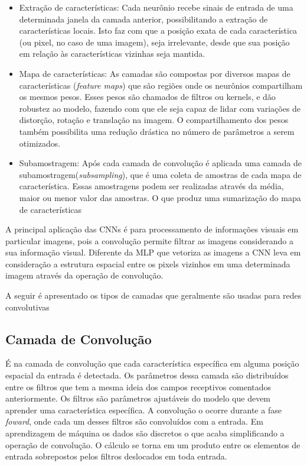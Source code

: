\begin{itemize}
	\item Extração de características: Cada neurônio recebe sinais de entrada de uma determinada janela da camada anterior, possibilitando a extração de características locais. Isto faz com que a posição exata de cada característica (ou pixel, no caso de uma imagem), seja irrelevante, desde que sua posição em relação às características vizinhas seja mantida.
	\item Mapa de características: As camadas são compostas por diversos mapas de características (\textit{feature maps}) que são regiões onde os neurônios compartilham os mesmos pesos. Esses pesos são chamados de filtros ou kernels, e dão robustez ao modelo, fazendo com que ele seja capaz de lidar com variações de distorção, rotação e translação na imagem. O compartilhamento dos pesos também possibilita uma redução drástica no número de parâmetros a serem otimizados.
	\item Subamostragem: Após cada camada de convolução é aplicada uma camada de subamostragem(\textit{subsampling}), que é uma coleta de amostras de cada mapa de característica. Essas amostragens podem ser realizadas através da média, maior ou menor valor das amostras. O que produz uma sumarização do mapa de características
\end{itemize}

A principal aplicação das CNNs é para processamento de informações visuais em particular imagens, pois a convolução permite filtrar as imagens considerando a sua informação visual. Diferente da MLP que vetoriza as imagens a CNN leva em consideração a estrutura espacial entre os pixels vizinhos em uma determinada imagem através da operação de convolução.

A seguir é apresentado os tipos de camadas que geralmente são usadas para redes convolutivas

\subsection{Camada de Convolução}
É na camada de convolução que cada característica específica em alguma posição espacial da entrada é detectada. Os parâmetros dessa camada são distribuídos entre os filtros que tem a mesma ideia dos campos receptivos comentados anteriormente. Os filtros são parâmetros ajustáveis do modelo que devem aprender uma característica específica.  A convolução o ocorre durante a fase \textit{foward}, onde cada um desses filtros são convoluídos com a entrada. Em aprendizagem de máquina os dados são discretos o que acaba simplificando a operação de convolução. O cálculo se torna em um produto entre os elementos de entrada sobrepostos pelos filtros deslocados em toda entrada. 

